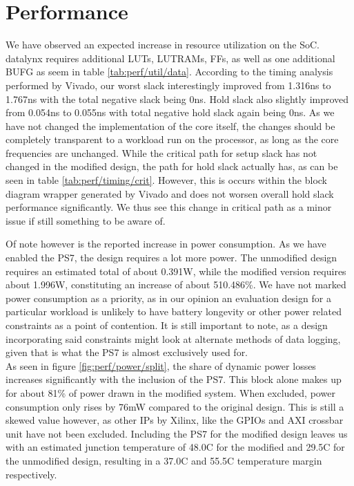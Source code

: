 \documentclass[../bachelor_paper.tex]{subfiles}
\begin{document}
\chapter{Performance}
    \label{ch:perf}
    
We have observed an expected increase in resource utilization on the \ac{SoC}. datalynx requires additional \acp{LUT}, \acsp{LUTRAM}, \acp{FF}, as well as one additional \ac{BUFG} as seem in table \ref{tab:perf/util/data}. According to the timing analysis performed by Vivado\textsuperscript{\textregistered}, our worst slack interestingly improved from 1.316ns to 1.767ns with the total negative slack being 0ns. Hold slack also slightly improved from 0.054ns to 0.055ns with total negative hold slack again being 0ns. As we have not changed the implementation of the core itself, the changes should be completely transparent to a workload run on the processor, as long as the core frequencies are unchanged. While the critical path for setup slack has not changed in the modified design, the path for hold slack actually has, as can be seen in table \ref{tab:perf/timing/crit}. However, this is occurs within the block diagram wrapper generated by Vivado\textsuperscript{\textregistered} and does not worsen overall hold slack performance significantly. We thus see this change in critical path as a minor issue if still something to be aware of.

Of note however is the reported increase in power consumption. As we have enabled the \ac{PS7}, the design requires a lot more power. The unmodified design requires an estimated total of about 0.391W, while the modified version requires about 1.996W, constituting an increase of about 510.486\%. We have not marked power consumption as a priority, as in our opinion an evaluation design for a particular workload is unlikely to have battery longevity or other power related constraints as a point of contention. It is still important to note, as a design incorporating said constraints might look at alternate methods of data logging, given that is what the \ac{PS7} is almost exclusively used for.\\
As seen in figure \ref{fig:perf/power/split}, the share of dynamic power losses increases significantly with the inclusion of the \ac{PS7}. This block alone makes up for about 81\% of power drawn in the modified system. When excluded, power consumption only rises by 76mW compared to the original design. This is still a skewed value however, as other \acp{IP} by Xilinx\textsuperscript{\textregistered}, like the GPIOs and AXI crossbar unit have not been excluded. Including the \ac{PS7} for the modified design leaves us with an estimated junction temperature of 48.0\textdegree C for the modified and 29.5\textdegree C for the unmodified design, resulting in a 37.0\textdegree C and 55.5\textdegree C temperature margin respectively.
\end{document}
